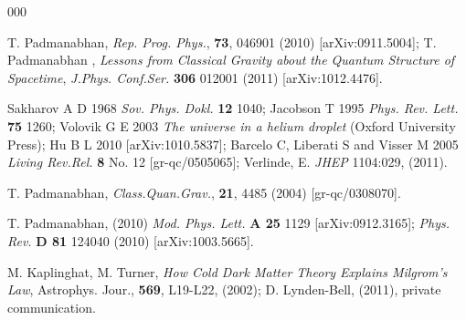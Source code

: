 \documentclass[aps,prd,showpacs,nofootinbib,floats,floatfix,preprintnumbers,groupedaddress,twocolumn]{revtex4}
\begin{document}
  



\begin{thebibliography}{000}

T. Padmanabhan, \textit{Rep. Prog. Phys.}, \textbf{73}, 046901 (2010) [arXiv:0911.5004]; 
T. Padmanabhan , \textit{Lessons from Classical Gravity about the Quantum Structure of Spacetime}, \textit{J.Phys. Conf.Ser.}  \textbf{306}  012001 (2011) [arXiv:1012.4476].
 
Sakharov A D  1968  \textit{Sov. Phys. Dokl.} {\bf 12} 1040;
Jacobson T  1995 \textit{Phys. Rev. Lett.} \textbf{75}  1260;
Volovik G E  2003 \textit{The universe in a helium droplet} (Oxford University Press);
Hu B L 2010  [arXiv:1010.5837]; 
Barcelo C,  Liberati S and Visser M 2005
 \textit{Living Rev.Rel.} \textbf{8} No. 12 [gr-qc/0505065];
Verlinde, E. \textit{JHEP} 1104:029, (2011).

 T. Padmanabhan, \textit{Class.Quan.Grav.}, \textbf{21}, 4485 (2004) [gr-qc/0308070]. 

 T. Padmanabhan, (2010) \textit{Mod. Phys. Lett.} \textbf{A 25} 1129  [arXiv:0912.3165];
\textit{Phys. Rev.} \textbf{D 81} 124040 (2010) [arXiv:1003.5665].

 M. Kaplinghat, M. Turner, \textit{How Cold Dark Matter Theory Explains Milgrom's Law},
Astrophys. Jour., \textbf{569}, L19-L22, (2002); 
D. Lynden-Bell, (2011), private communication.



\end{thebibliography}
 
\end{document}
